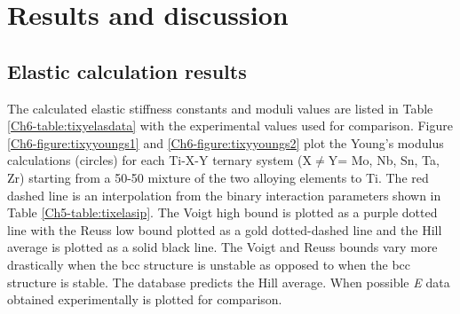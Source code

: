 \section{Results and discussion}

\subsection{Elastic calculation results}

The calculated elastic stiffness constants and moduli values are listed in Table \ref{Ch6-table:tixyelasdata} with the experimental values used for comparison. Figure \ref{Ch6-figure:tixyyoungs1} and \ref{Ch6-figure:tixyyoungs2} plot the Young's modulus calculations (circles) for each Ti-X-Y ternary system (X$\neq$Y= Mo, Nb, Sn, Ta, Zr) starting from a 50-50 mixture of the two alloying elements to Ti. The red dashed line is an interpolation from the binary interaction parameters shown in Table \ref{Ch5-table:tixelasip}. The Voigt high bound is plotted as a purple dotted line with the Reuss low bound plotted as a gold dotted-dashed line and the Hill average is plotted as a solid black line. The Voigt and Reuss bounds vary more drastically when the bcc structure is unstable as opposed to when the bcc structure is stable. The database predicts the Hill average.  When possible \textit{E} data obtained experimentally is plotted for comparison. 

